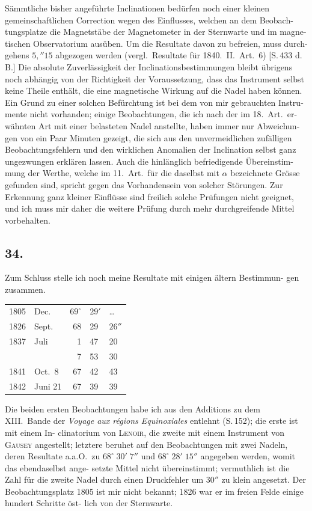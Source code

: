 \documentclass[12pt,a4paper]{article}
\begin{document}
Sämmtliche bisher angeführte Inclinationen bedürfen noch einer kleinen 
gemeinschaftlichen Correction wegen des Einflusses, welchen an dem Beobach-
tungsplatze die Magnetstäbe der Magnetometer in der Sternwarte und im magne-
tischen Observatorium ausüben. Um die Resultate davon zu befreien, muss durch-
gehens $5{,}''15$ abgezogen werden (vergl.\ Resultate für 1840.\ II.\ Art.\ 6) [S.\,433 d.\,B.]
Die absolute Zuverlässigkeit der Inclinationsbestimmungen bleibt übrigens 
noch abhängig von der Richtigkeit der Voraussetzung, dass das Instrument selbst 
keine Theile enthält, die eine magnetische Wirkung auf die Nadel haben können. 
Ein Grund zu einer solchen Befürchtung ist bei dem von mir gebrauchten Instru-
mente nicht vorhanden; einige Beobachtungen, die ich nach der im 18.\ Art.\ er-
wähnten Art mit einer belasteten Nadel anstellte, haben immer nur Abweichun-
gen von ein Paar Minuten gezeigt, die sich aus den unvermeidlichen zufälligen 
Beobachtungsfehlern und den wirklichen Anomalien der Inclination selbst ganz 
ungezwungen erklären lassen. Auch die hinlänglich befriedigende Übereinstim-
mung der Werthe, welche im 11.\ Art.\ für die daselbst mit $\alpha$ bezeichnete Grösse 
gefunden sind, spricht gegen das Vorhandensein von solcher Störungen. Zur 
Erkennung ganz kleiner Einflüsse sind freilich solche Prüfungen nicht geeignet, 
und ich muss mir daher die weitere Prüfung durch mehr durchgreifende Mittel 
vorbehalten.

\subsection*{34.}

Zum Schluss stelle ich noch meine Resultate mit einigen ältern Bestimmun-
gen zusammen.

\begin{center}
\begin{tabular}{r@{\ }l@{\ }r@{\ }l@{\ }l}
1805 & Dec.\ & $69^\circ$ & $29'$ & \ldots \\
1826 & Sept.\ & 68 & 29 & $26''$ \\
1837 & Juli & 1 & 47 & 20 \\
& & 7 & 53 & 30 \\
1841 & Oct.\ 8 & 67 & 42 & 43 \\
1842 & Juni 21 & 67 & 39 & 39 \\
\end{tabular}
\end{center}

Die beiden ersten Beobachtungen habe ich aus den Additions zu dem XIII.\ Bande 
der \textit{Voyage aux régions Equinoxiales} entlehnt (S.\,152); die erste ist mit einem In-
clinatorium von \textsc{Lenoir}, die zweite mit einem Instrument von \textsc{Gausey} angestellt; 
letztere beruhet auf den Beobachtungen mit zwei Nadeln, deren Resultate a.a.O.\ 
zu $68^\circ\; 30'\; 7''$ und $68^\circ\; 28'\; 15''$ angegeben werden, womit das ebendaselbst ange-
setzte Mittel nicht übereinstimmt; vermuthlich ist die Zahl für die zweite Nadel 
durch einen Druckfehler um $30''$ zu klein angesetzt. Der Beobachtungsplatz 1805 
ist mir nicht bekannt; 1826 war er im freien Felde einige hundert Schritte öst-
lich von der Sternwarte.
\end{document}
